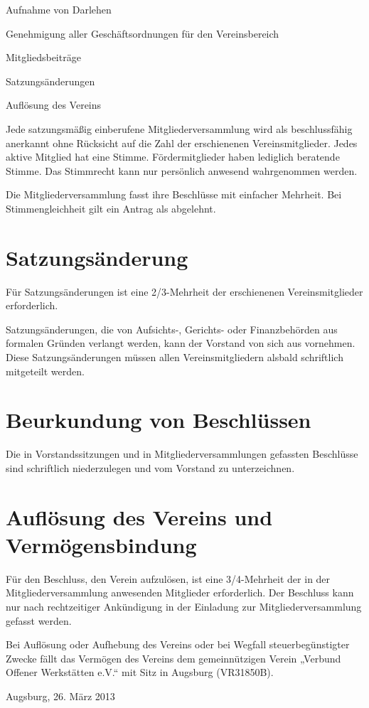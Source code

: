 \documentclass[a5paper, ngerman, 10pt]{scrreprt}
\begin{document}
\begin{compactenum}[(1)]
\begin{compactenum}[a.]
        \item Aufnahme von Darlehen
        \item Genehmigung aller Geschäftsordnungen für den Vereinsbereich
        \item Mitgliedsbeiträge
        \item Satzungsänderungen
        \item Auflösung des Vereins
    \end{compactenum}
    \item Jede satzungsmäßig einberufene Mitgliederversammlung wird als
        beschlussfähig anerkannt ohne Rücksicht auf die Zahl der erschienenen
        Vereinsmitglieder. Jedes aktive Mitglied hat eine Stimme.
        Fördermitglieder haben lediglich beratende Stimme. Das Stimmrecht kann
        nur persönlich anwesend wahrgenommen werden.
    \item Die Mitgliederversammlung fasst ihre Beschlüsse mit einfacher
        Mehrheit.  Bei Stimmengleichheit gilt ein Antrag als abgelehnt.
\end{compactenum}


\section{Satzungsänderung}
\begin{compactenum}[(1)]
    \item Für Satzungsänderungen ist eine 2/3-Mehrheit der erschienenen
        Vereinsmitglieder erforderlich.
    \item Satzungsänderungen, die von Aufsichts-, Gerichts- oder Finanzbehörden
        aus formalen Gründen verlangt werden, kann der Vorstand von sich aus
        vornehmen. Diese Satzungsänderungen müssen allen Vereinsmitgliedern
        alsbald schriftlich mitgeteilt werden.
\end{compactenum}


\section{Beurkundung von Beschlüssen}
Die in Vorstandssitzungen und in Mitgliederversammlungen gefassten Beschlüsse
sind schriftlich niederzulegen und vom Vorstand zu unterzeichnen.


\section{Auflösung des Vereins und Vermögensbindung}
\begin{compactenum}[(1)]
    \item Für den Beschluss, den Verein aufzulösen, ist eine 3/4-Mehrheit der
        in der Mitgliederversammlung anwesenden Mitglieder erforderlich. Der
        Beschluss kann nur nach rechtzeitiger Ankündigung in der Einladung zur
        Mitgliederversammlung gefasst werden.
    \item Bei Auflösung oder Aufhebung des Vereins oder bei Wegfall
        steuerbegünstigter Zwecke fällt das Vermögen des Vereins dem
        gemeinnützigen Verein „Verbund Offener Werkstätten e.V.“ mit Sitz in
        Augsburg (VR31850B).
\end{compactenum}

\vspace{\fill}
Augsburg, 26. März 2013
\end{document}

